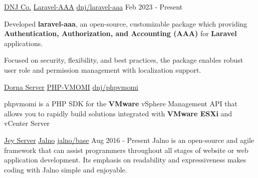 
\begin{cventries}
	\cventry
		{\href{https://dnj.co.ir}{DNJ Co.}} %
		{\href{https://github.com/dnj/laravel-aaa}{\faGithubSquare\acvHeaderIconSep Laravel-AAA}} %
		{\href{https://github.com/dnj/laravel-aaa}{\faGithubSquare\acvHeaderIconSep dnj/laravel-aaa}} %
		{Feb 2023 - Present} %
		{
			\begin{cvitems}
				\item {Developed \textbf{laravel-aaa}, an open-source, customizable package which providing \textbf{Authentication, Authorization, and Accounting (AAA)} for \textbf{Laravel} applications.}
				\item {Focused on security, flexibility, and best practices, the package enables robust user role and permission management with localization support.}
			\end{cvitems}
		}

    \cventry
	  {\href{https://dornaserver.com/}{Dorna Server}} %
	  {\href{https://github.com/dnj/phpvmomi}{\faGithubSquare\acvHeaderIconSep PHP-VMOMI}} %
	  {\href{https://github.com/dnj/phpvmomi}{\faGithubSquare\acvHeaderIconSep dnj/phpvmomi}} %
	  {} %
	  {
		    	\begin{cvitems}
		    		\item {phpvmomi is a PHP SDK for the \textbf{VMware} vSphere Management API that allows you to rapidly build solutions integrated with \textbf{VMware ESXi} and vCenter Server}
		    	\end{cvitems}
	  }

	\cventry
		{\href{https://jeyserver.com}{Jey Server}} %
		{\href{https://jalno.ir/en/}{\acvHeaderIconSep Jalno}} %
		{\href{https://github.com/jalno/base}{\faGithubSquare\acvHeaderIconSep jalno/base}} %
		{Aug 2016 - Present} %
		{Jalno is an open-source and agile framework that can assist programmers throughout all stages of website or web application development. Its emphasis on readability and expressiveness makes coding with Jalno simple and enjoyable.}

\end{cventries}
